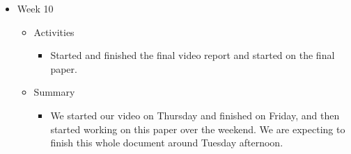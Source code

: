 \begin{itemize}
\begin{itemize}
\begin{itemize}
\end{itemize}
\end{itemize}
\item Week 10
\begin{itemize}
\item Activities
\begin{itemize}
\item Started and finished the final video report and started on the final paper.
\end{itemize}
\item Summary
\begin{itemize}
\item We started our video on Thursday and finished on Friday, and then started working on this paper over the weekend. We are expecting to finish this whole document around Tuesday afternoon.
\end{itemize}
\end{itemize}
\end{itemize}